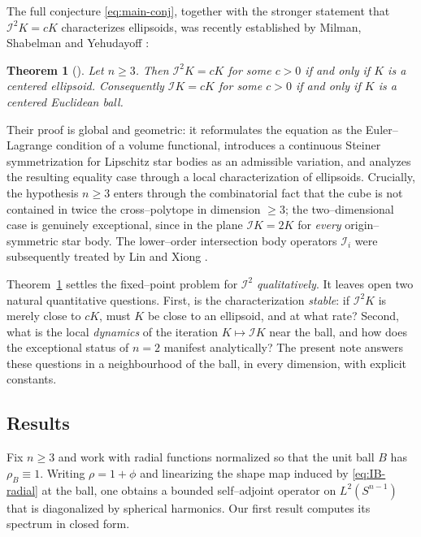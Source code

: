 \documentclass[11pt,reqno]{amsart}
\theoremstyle{plain}
\newtheorem{theorem}{Theorem}[section]
\theoremstyle{definition}
\newcommand{\Sph}{S^{n-1}}
\newcommand{\IB}{\mathcal{I}}
\begin{document}
The full conjecture \eqref{eq:main-conj}, together with the stronger
statement that $\IB^2 K = cK$ characterizes ellipsoids, was recently
established by Milman, Shabelman and Yehudayoff \cite{MSY2025}:

\begin{theorem}[\cite{MSY2025}]\label{thm:MSY}
Let $n\ge 3$. Then $\IB^2 K = cK$ for some $c>0$ if and only if $K$ is a
centered ellipsoid. Consequently $\IB K = cK$ for some $c>0$ if and only if
$K$ is a centered Euclidean ball.
\end{theorem}

Their proof is global and geometric: it reformulates the equation as the
Euler--Lagrange condition of a volume functional, introduces a continuous
Steiner symmetrization for Lipschitz star bodies as an admissible variation,
and analyzes the resulting equality case through a local characterization of
ellipsoids. Crucially, the hypothesis $n\ge 3$ enters through the combinatorial
fact that the cube is not contained in twice the cross--polytope in dimension
$\ge 3$; the two--dimensional case is genuinely exceptional, since in the plane
$\IB K = 2K$ for \emph{every} origin--symmetric star body. The lower--order
intersection body operators $\IB_i$ were subsequently treated by Lin and Xiong
\cite{LinXiong2025}.

Theorem~\ref{thm:MSY} settles the fixed--point problem for $\IB^2$
\emph{qualitatively}. It leaves open two natural quantitative questions.
First, is the characterization \emph{stable}: if $\IB^2 K$ is merely close to
$cK$, must $K$ be close to an ellipsoid, and at what rate? Second, what is the
local \emph{dynamics} of the iteration $K\mapsto \IB K$ near the ball, and how
does the exceptional status of $n=2$ manifest analytically? The present note
answers these questions in a neighbourhood of the ball, in every dimension,
with explicit constants.

\subsection{Results}
Fix $n\ge 3$ and work with radial functions normalized so that the unit ball
$B$ has $\rho_B\equiv 1$. Writing $\rho = 1+\phi$ and linearizing the shape map
induced by \eqref{eq:IB-radial} at the ball, one obtains a bounded self--adjoint
operator on $L^2(\Sph)$ that is diagonalized by spherical harmonics. Our first
result computes its spectrum in closed form.
\end{document}
